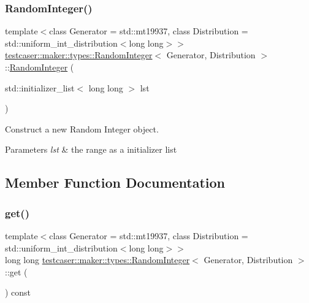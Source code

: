 \subsubsection{\texorpdfstring{Random\+Integer()}{RandomInteger()}\hspace{0.1cm}{\footnotesize\ttfamily [2/2]}}
{\footnotesize\ttfamily template$<$class Generator = std\+::mt19937, class Distribution = std\+::uniform\+\_\+int\+\_\+distribution$<$long long$>$$>$ \\
\hyperlink{classtestcaser_1_1maker_1_1types_1_1RandomInteger}{testcaser\+::maker\+::types\+::\+Random\+Integer}$<$ Generator, Distribution $>$\+::\hyperlink{classtestcaser_1_1maker_1_1types_1_1RandomInteger}{Random\+Integer} (\begin{DoxyParamCaption}\item[{std\+::initializer\+\_\+list$<$ long long $>$}]{lst }\end{DoxyParamCaption})\hspace{0.3cm}{\ttfamily [inline]}}



Construct a new Random Integer object. 


\begin{DoxyParams}{Parameters}
{\em lst} & the range as a initializer list \\
\hline
\end{DoxyParams}


\subsection{Member Function Documentation}
\mbox{\label{classtestcaser_1_1maker_1_1types_1_1RandomInteger_a3b7754ca1c579f58b959ca6adb483a51}} 
\subsubsection{\texorpdfstring{get()}{get()}}
{\footnotesize\ttfamily template$<$class Generator = std\+::mt19937, class Distribution = std\+::uniform\+\_\+int\+\_\+distribution$<$long long$>$$>$ \\
long long \hyperlink{classtestcaser_1_1maker_1_1types_1_1RandomInteger}{testcaser\+::maker\+::types\+::\+Random\+Integer}$<$ Generator, Distribution $>$\+::get (\begin{DoxyParamCaption}{ }\end{DoxyParamCaption}) const\hspace{0.3cm}{\ttfamily [inline]}}




